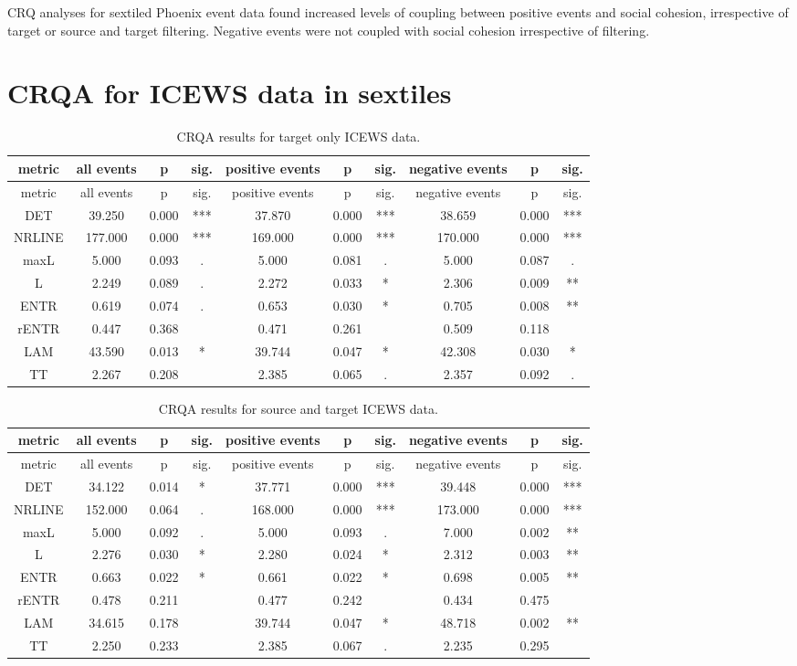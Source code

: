 \documentclass[english,man]{apa6}
\begin{document}
\begin{appendix}
CRQ analyses for sextiled Phoenix event data found increased levels of
coupling between positive events and social cohesion, irrespective of
target or source and target filtering. Negative events were not coupled
with social cohesion irrespective of filtering.

\hypertarget{crqa-for-icews-data-in-sextiles}{%
\section{CRQA for ICEWS data in
sextiles}\label{crqa-for-icews-data-in-sextiles}}

\begin{longtable}[]{@{}cccccccccc@{}}
\caption{CRQA results for target only ICEWS data.}\tabularnewline
\toprule
metric & all events & p & sig. & positive events & p & sig. & negative
events & p & sig.\tabularnewline
\midrule
\endfirsthead
\toprule
metric & all events & p & sig. & positive events & p & sig. & negative
events & p & sig.\tabularnewline
\midrule
\endhead
DET & 39.250 & 0.000 & *** & 37.870 & 0.000 & *** & 38.659 & 0.000 &
***\tabularnewline
NRLINE & 177.000 & 0.000 & *** & 169.000 & 0.000 & *** & 170.000 & 0.000
& ***\tabularnewline
maxL & 5.000 & 0.093 & . & 5.000 & 0.081 & . & 5.000 & 0.087 &
.\tabularnewline
L & 2.249 & 0.089 & . & 2.272 & 0.033 & * & 2.306 & 0.009 &
**\tabularnewline
ENTR & 0.619 & 0.074 & . & 0.653 & 0.030 & * & 0.705 & 0.008 &
**\tabularnewline
rENTR & 0.447 & 0.368 & & 0.471 & 0.261 & & 0.509 & 0.118
&\tabularnewline
LAM & 43.590 & 0.013 & * & 39.744 & 0.047 & * & 42.308 & 0.030 &
*\tabularnewline
TT & 2.267 & 0.208 & & 2.385 & 0.065 & . & 2.357 & 0.092 &
.\tabularnewline
\bottomrule
\end{longtable}

\begin{longtable}[]{@{}cccccccccc@{}}
\caption{CRQA results for source and target ICEWS data.}\tabularnewline
\toprule
metric & all events & p & sig. & positive events & p & sig. & negative
events & p & sig.\tabularnewline
\midrule
\endfirsthead
\toprule
metric & all events & p & sig. & positive events & p & sig. & negative
events & p & sig.\tabularnewline
\midrule
\endhead
DET & 34.122 & 0.014 & * & 37.771 & 0.000 & *** & 39.448 & 0.000 &
***\tabularnewline
NRLINE & 152.000 & 0.064 & . & 168.000 & 0.000 & *** & 173.000 & 0.000 &
***\tabularnewline
maxL & 5.000 & 0.092 & . & 5.000 & 0.093 & . & 7.000 & 0.002 &
**\tabularnewline
L & 2.276 & 0.030 & * & 2.280 & 0.024 & * & 2.312 & 0.003 &
**\tabularnewline
ENTR & 0.663 & 0.022 & * & 0.661 & 0.022 & * & 0.698 & 0.005 &
**\tabularnewline
rENTR & 0.478 & 0.211 & & 0.477 & 0.242 & & 0.434 & 0.475
&\tabularnewline
LAM & 34.615 & 0.178 & & 39.744 & 0.047 & * & 48.718 & 0.002 &
**\tabularnewline
TT & 2.250 & 0.233 & & 2.385 & 0.067 & . & 2.235 & 0.295
&\tabularnewline
\bottomrule
\end{longtable}


\end{appendix}
\end{document}
